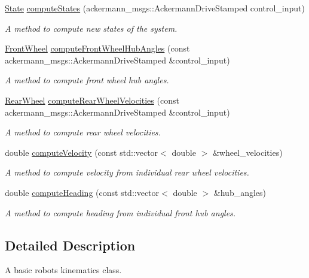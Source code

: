\begin{DoxyCompactItemize}
\hyperlink{structState}{State} \hyperlink{classKinematics_adb73a0d2efe57b3be58daee9bfb989e3}{compute\+States} (ackermann\+\_\+msgs\+::\+Ackermann\+Drive\+Stamped control\+\_\+input)
\begin{DoxyCompactList}\small\item\em A method to compute new states of the system. \end{DoxyCompactList}\item 
\hyperlink{structFrontWheel}{Front\+Wheel} \hyperlink{classKinematics_af5e5528ca44f82edae99025410595a36}{compute\+Front\+Wheel\+Hub\+Angles} (const ackermann\+\_\+msgs\+::\+Ackermann\+Drive\+Stamped \&control\+\_\+input)
\begin{DoxyCompactList}\small\item\em A method to compute front wheel hub angles. \end{DoxyCompactList}\item 
\hyperlink{structRearWheel}{Rear\+Wheel} \hyperlink{classKinematics_ac2733720e49bcd20662e74ea9334a878}{compute\+Rear\+Wheel\+Velocities} (const ackermann\+\_\+msgs\+::\+Ackermann\+Drive\+Stamped \&control\+\_\+input)
\begin{DoxyCompactList}\small\item\em A method to compute rear wheel velocities. \end{DoxyCompactList}\item 
double \hyperlink{classKinematics_a7159c40fdd982621f5def3e8aeb5687d}{compute\+Velocity} (const std\+::vector$<$ double $>$ \&wheel\+\_\+velocities)
\begin{DoxyCompactList}\small\item\em A method to compute velocity from individual rear wheel velocities. \end{DoxyCompactList}\item 
double \hyperlink{classKinematics_a333f2e56be9d8eda2ff9ed4217dac860}{compute\+Heading} (const std\+::vector$<$ double $>$ \&hub\+\_\+angles)
\begin{DoxyCompactList}\small\item\em A method to compute heading from individual front hub angles. \end{DoxyCompactList}\end{DoxyCompactItemize}


\subsection{Detailed Description}
A basic robot\textquotesingle{}s kinematics class. 

